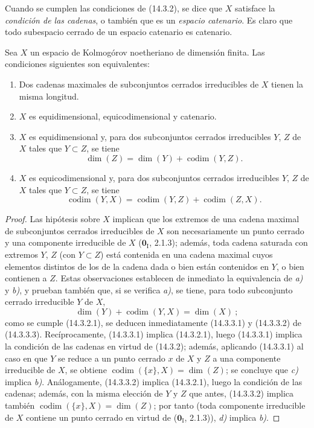 Cuando se cumplen las condiciones de (14.3.2), se dice que $X$ satisface la
\emph{condición de las cadenas}, o también que es un \emph{espacio catenario}.
Es claro que todo subespacio cerrado de un espacio catenario es catenario.

\begin{proposition}[14.3.3]
\label{0.14.3.3-es}
Sea $X$ un espacio de Kolmogórov noetheriano de dimensión finita. Las
condiciones siguientes son equivalentes:
\begin{enumerate}
  \item[\rm a)] Dos cadenas maximales de subconjuntos cerrados irreducibles de
  $X$ tienen la misma longitud.
  \item[\rm b)] $X$ es equidimensional, equicodimensional y catenario.
  \item[\textup{c)}] $X$ es equidimensional y, para dos subconjuntos cerrados
  irreducibles $Y$, $Z$ de $X$ tales que $Y\subset Z$, se tiene
  \[
    \dim(Z)=\dim(Y)+\operatorname{codim}(Y,Z).
    \tag{14.3.3.1}\label{0.14.3.3.1-es}
  \]
  \item[\textup{d)}] $X$ es equicodimensional y, para dos subconjuntos cerrados
  irreducibles $Y$, $Z$ de $X$ tales que $Y\subset Z$, se tiene
  \[
    \operatorname{codim}(Y,X)=
    \operatorname{codim}(Y,Z)+\operatorname{codim}(Z,X).
    \tag{14.3.3.2}\label{0.14.3.3.2-es}
  \]
\end{enumerate}
\end{proposition}

\begin{proof}
Las hipótesis sobre $X$ implican que los extremos de una cadena maximal de
subconjuntos cerrados irreducibles de $X$ son necesariamente un punto cerrado y
una componente irreducible de $X$ ($\mathbf 0_{\mathrm I}$, 2.1.3); además, toda
cadena saturada con extremos $Y$, $Z$ (con $Y\subset Z$) está contenida en una
cadena maximal cuyos elementos distintos de los de la cadena dada o bien están
contenidos en $Y$, o bien contienen a $Z$. Estas observaciones establecen de
inmediato la equivalencia de \emph{a)} y \emph{b)}, y prueban también que, si se verifica \emph{a)},
se tiene, para todo subconjunto cerrado irreducible $Y$ de $X$,
\[
  \dim(Y)+\operatorname{codim}(Y,X)=\dim(X)~;
  \tag{14.3.3.3}\label{0.14.3.3.3-es}
\]
como se cumple (14.3.2.1), se deducen inmediatamente (14.3.3.1) y (14.3.3.2)
de (14.3.3.3). Recíprocamente, (14.3.3.1) implica (14.3.2.1), luego
(14.3.3.1) implica la condición de las cadenas en virtud de (14.3.2); además,
aplicando (14.3.3.1) al caso en que $Y$ se reduce a un punto cerrado $x$ de $X$
y $Z$ a una componente irreducible de $X$, se obtiene
$\operatorname{codim}(\{x\},X)=\dim(Z)$; se concluye que \emph{c)} implica \emph{b)}.
Análogamente, (14.3.3.2) implica (14.3.2.1), luego la condición de las cadenas;
además, con la misma elección de $Y$ y $Z$ que antes, (14.3.3.2) implica
también $\operatorname{codim}(\{x\},X)=\dim(Z)$; por tanto (toda componente
irreducible de $X$ contiene un punto cerrado en virtud de ($\mathbf 0_{\mathrm I}$,
2.1.3)), \emph{d)} implica \emph{b)}.
\end{proof}

